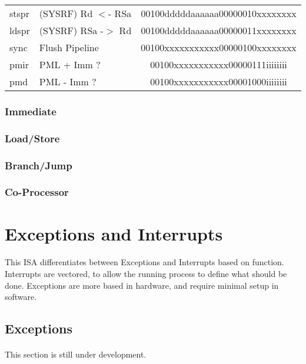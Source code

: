 \documentclass[letterpaper, 11pt]{article}
\begin{document}
\begin{center}
\begin{longtable}{|l|l|c|}
			stspr		& (SYSRF) Rd $<$- RSa							& 00100dddddaaaaaa00000010xxxxxxxx\\
			ldspr		& (SYSRF) RSa -$>$ Rd							& 00100dddddaaaaaa00000011xxxxxxxx\\
			sync		& Flush Pipeline								& 00100xxxxxxxxxxx00000100xxxxxxxx\\
			pmir		& PML + Imm ?									& 00100xxxxxxxxxxx00000111iiiiiiii\\
			pmd			& PML - Imm ?									& 00100xxxxxxxxxxx00001000iiiiiiii\\
			\hline
		\end{longtable}
	\end{center}


\subsubsection{Immediate}
\subsubsection{Load/Store}
\subsubsection{Branch/Jump}
\subsubsection{Co-Processor}



\section{Exceptions and Interrupts}
\paragraph{} This ISA differentiates between Exceptions and Interrupts based on function. Interrupts are vectored, to allow
the running process to define what should be done. Exceptions are more based in hardware, and require minimal setup in software.

\subsection{Exceptions}
\paragraph{} This section is still under development. 
\end{document}
